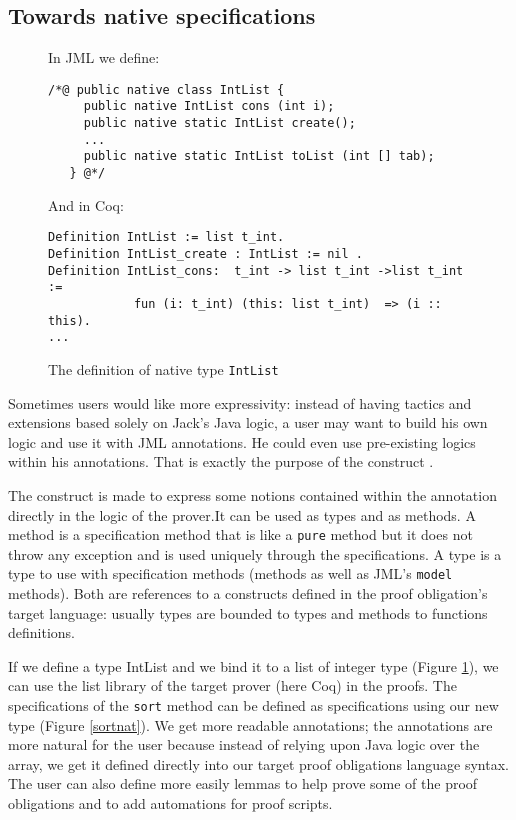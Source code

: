 \subsection{Towards native specifications}
\begin{figure}[t!]
{\small In JML we define:
\begin{verbatim}
/*@ public native class IntList {
     public native IntList cons (int i);
     public native static IntList create();
     ...
     public native static IntList toList (int [] tab);
   } @*/ \end{verbatim}}

{\small And in Coq:
\begin{verbatim}
Definition IntList := list t_int.
Definition IntList_create : IntList := nil .  
Definition IntList_cons:  t_int -> list t_int ->list t_int := 
            fun (i: t_int) (this: list t_int)  => (i :: this).
... \end{verbatim}}
\caption{The definition of native type \texttt{IntList}}\label{CoqAnnot} 
\end{figure}
Sometimes users would like more expressivity: instead of having
tactics and extensions based solely on Jack's Java logic, a user may want to
build his own logic and use it with JML annotations. He could 
even use pre-existing logics within his annotations. That is 
exactly the purpose of the \native construct \cite{Charles06}.

The \native construct is made to express some notions contained within
the annotation directly in the logic of the prover.It can be used 
as \native types and as  \native methods.
A \native method is a specification method that is like a {\tt pure} method 
but  it does not throw any exception and is used uniquely through the specifications. 
A \native type is a type to use with specification methods (\native methods as well as 
JML's {\tt model} methods). Both are references to a constructs 
defined in the proof obligation's target language: usually \native types are bounded to 
types and \native methods to functions definitions.


If we define a \native type IntList and we bind it to a list of integer type 
 (Figure \ref{CoqAnnot}), we can use the list library of the target prover (here Coq) 
in the proofs. The specifications of the
{\tt sort} method can be defined as specifications using our new type 
(Figure \ref{sortnat}). We get more readable annotations;
the annotations are more natural for the user because instead
 of relying upon Java logic over the array, we get it defined directly into
our target proof obligations language syntax.
The user can also define more easily lemmas to help prove some of the proof
obligations and to add automations for proof scripts.


